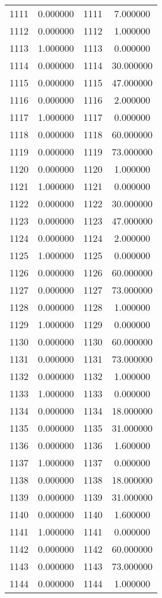 \documentclass[12pt]{article}
\begin{document}
\begin{longtable}{@{}cccc@{}}
1111 & 0.000000 & 1111 & 7.000000 \\
1112 & 0.000000 & 1112 & 1.000000 \\
1113 & 1.000000 & 1113 & 0.000000 \\
1114 & 0.000000 & 1114 & 30.000000 \\
1115 & 0.000000 & 1115 & 47.000000 \\
1116 & 0.000000 & 1116 & 2.000000 \\
1117 & 1.000000 & 1117 & 0.000000 \\
1118 & 0.000000 & 1118 & 60.000000 \\
1119 & 0.000000 & 1119 & 73.000000 \\
1120 & 0.000000 & 1120 & 1.000000 \\
1121 & 1.000000 & 1121 & 0.000000 \\
1122 & 0.000000 & 1122 & 30.000000 \\
1123 & 0.000000 & 1123 & 47.000000 \\
1124 & 0.000000 & 1124 & 2.000000 \\
1125 & 1.000000 & 1125 & 0.000000 \\
1126 & 0.000000 & 1126 & 60.000000 \\
1127 & 0.000000 & 1127 & 73.000000 \\
1128 & 0.000000 & 1128 & 1.000000 \\
1129 & 1.000000 & 1129 & 0.000000 \\
1130 & 0.000000 & 1130 & 60.000000 \\
1131 & 0.000000 & 1131 & 73.000000 \\
1132 & 0.000000 & 1132 & 1.000000 \\
1133 & 1.000000 & 1133 & 0.000000 \\
1134 & 0.000000 & 1134 & 18.000000 \\
1135 & 0.000000 & 1135 & 31.000000 \\
1136 & 0.000000 & 1136 & 1.600000 \\
1137 & 1.000000 & 1137 & 0.000000 \\
1138 & 0.000000 & 1138 & 18.000000 \\
1139 & 0.000000 & 1139 & 31.000000 \\
1140 & 0.000000 & 1140 & 1.600000 \\
1141 & 1.000000 & 1141 & 0.000000 \\
1142 & 0.000000 & 1142 & 60.000000 \\
1143 & 0.000000 & 1143 & 73.000000 \\
1144 & 0.000000 & 1144 & 1.000000 \\

\end{longtable}
\end{document}
